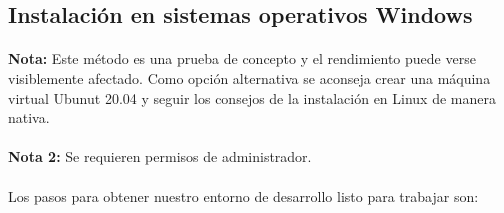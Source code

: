 \subsection{Instalación en sistemas operativos Windows}

\paragraph{}\textbf{Nota:} Este método es una prueba de concepto y el rendimiento puede
verse visiblemente afectado. Como opción alternativa se aconseja crear una máquina
virtual Ubunut 20.04 y seguir los consejos de la instalación en Linux de manera nativa.

\paragraph{}\textbf{Nota 2:} Se requieren permisos de administrador.

\paragraph{}Los pasos para obtener nuestro entorno de desarrollo listo para trabajar son:

